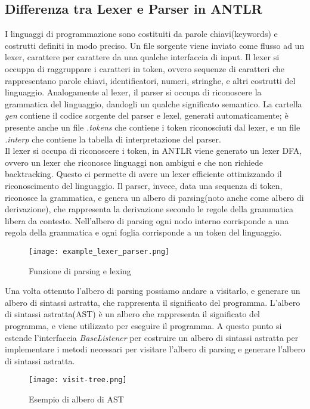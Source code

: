 \documentclass[../../main.tex]{subfiles}
\begin{document}
\subsection{Differenza tra Lexer e Parser in ANTLR}
I linguaggi di programmazione sono costituiti da parole chiavi(keywords) e costrutti definiti in modo preciso.
Un file sorgente viene inviato come flusso ad un lexer, carattere per carattere da una qualche interfaccia di input.
Il lexer si occuppa di raggruppare i caratteri in token, ovvero sequenze di caratteri che rappresentano parole chiavi, identificatori, numeri, stringhe, e altri costrutti del linguaggio.
Analogamente al lexer, il parser si occupa di riconoscere la grammatica del linguaggio, dandogli un qualche significato semantico.
La cartella \textit{gen} contiene il codice sorgente del parser e lexel, generati automaticamente; è presente anche un file \textit{.tokens} che contiene i token riconosciuti dal lexer, e un file \textit{.interp} che contiene la tabella di interpretazione del parser.\\
Il lexer si occupa di riconoscere i token, in ANTLR viene generato un lexer DFA, ovvero un lexer che riconosce linguaggi non ambigui e che non richiede backtracking. Questo ci permette di avere un lexer efficiente ottimizzando il riconoscimento del linguaggio.
Il parser, invece, data una sequenza di token, riconosce la grammatica, e genera un albero di parsing(noto anche come albero di derivazione), che rappresenta la derivazione secondo le regole della grammatica libera da contesto. 
Nell'albero di parsing ogni nodo interno corrisponde a una regola della grammatica e ogni foglia corrisponde a un token del linguaggio.\autocite{mogensen2010basics}
\begin{figure}[H]
    \centering
    \texttt{[image: example\_lexer\_parser.png]}
    \caption{Funzione di parsing e lexing}
\end{figure}
Una volta ottenuto l'albero di parsing possiamo andare a visitarlo, e generare un albero di sintassi astratta, che rappresenta il significato del programma.
L'albero di sintassi astratta(AST) è un albero che rappresenta il significato del programma, e viene utilizzato per eseguire il programma.
A questo punto si estende l'interfaccia \textit{BaseListener} per costruire un albero di sintassi astratta per implementare i metodi necessari per visitare l'albero di parsing e generare l'albero di sintassi astratta.\autocite{antlrllkparser}
\begin{figure}[H]
    \centering
    \texttt{[image: visit-tree.png]}
    \caption{Esempio di albero di AST}
    \label{fig:visit_tree}
\end{figure}
\end{document}
